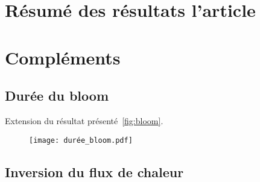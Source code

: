 
\label{chp:res-phenologie}
\graphicspath{{resources/res_phénologie}}

\minitoc%
\clearpage

\section{Résumé des résultats l'article}
\label{sec:resume-res-phenologie}

\section{Compléments}
\label{sec:complements-phenologie}

\subsection{Durée du bloom}
\label{sec:duree-bloom}

Extension du résultat présenté~\cref{fig:bloom}.

\begin{figure}
  \centering
  \texttt{[image: durée\_bloom.pdf]}
  \label{fig:duree-bloom}
\end{figure}

\subsection{Inversion du flux de chaleur}
\label{sec:flux-chaleur}
